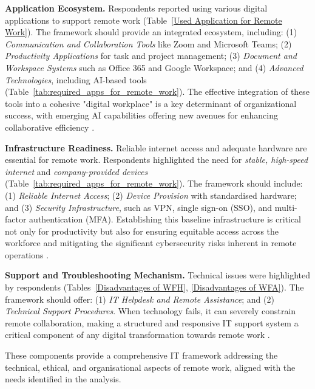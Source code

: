 \documentclass{infotel}
\begin{document}
\textbf{Application Ecosystem.}
Respondents reported using various digital applications to support remote work (Table~\ref{Used Application for Remote Work}). The framework should provide an integrated ecosystem, including: (1) \textit{Communication and Collaboration Tools} like Zoom and Microsoft Teams; (2) \textit{Productivity Applications} for task and project management; (3) \textit{Document and Workspace Systems} such as Office 365 and Google Workspace; and (4) \textit{Advanced Technologies}, including AI-based tools (Table~\ref{tab:required_apps_for_remote_work}). The effective integration of these tools into a cohesive "digital workplace" is a key determinant of organizational success, with emerging AI capabilities offering new avenues for enhancing collaborative efficiency \cite{Waizenegger2020, Vartiainen2020}.


\textbf{Infrastructure Readiness.}
Reliable internet access and adequate hardware are essential for remote work. Respondents highlighted the need for \textit{stable, high-speed internet} and \textit{company-provided devices} (Table~\ref{tab:required_apps_for_remote_work}). The framework should include: (1) \textit{Reliable Internet Access}; (2) \textit{Device Provision} with standardised hardware; and (3) \textit{Security Infrastructure}, such as VPN, single sign-on (SSO), and multi-factor authentication (MFA). Establishing this baseline infrastructure is critical not only for productivity but also for ensuring equitable access across the workforce and mitigating the significant cybersecurity risks inherent in remote operations \cite{Waizenegger2020, Oakman2020}.


\textbf{Support and Troubleshooting Mechanism.}
Technical issues were highlighted by respondents (Tables~\ref{Disadvantages of WFH}, \ref{Disadvantages of WFA}). The framework should offer: (1) \textit{IT Helpdesk and Remote Assistance}; and (2) \textit{Technical Support Procedures}. When technology fails, it can severely constrain remote collaboration, making a structured and responsive IT support system a critical component of any digital transformation towards remote work  \cite{Waizenegger2020, Charalampous2019}.


These components provide a comprehensive IT framework addressing the technical, ethical, and organisational aspects of remote work, aligned with the needs identified in the analysis.
\end{document}
